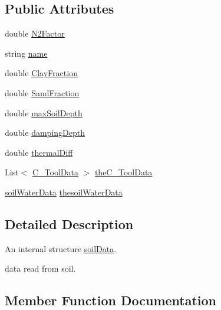 \subsection*{Public Attributes}
\begin{DoxyCompactItemize}
\item 
double \mbox{\hyperlink{struct_global_vars_1_1zone_specific_data_1_1soil_data_a787c2b731ff0fd4db270c8348e6cc8aa}{N2\+Factor}}
\item 
string \mbox{\hyperlink{struct_global_vars_1_1zone_specific_data_1_1soil_data_a9ecc5be71d90700844d9b81c63bdb783}{name}}
\item 
double \mbox{\hyperlink{struct_global_vars_1_1zone_specific_data_1_1soil_data_a407f8545f3d29ff6b7d3b93a8e4cc21c}{Clay\+Fraction}}
\item 
double \mbox{\hyperlink{struct_global_vars_1_1zone_specific_data_1_1soil_data_ad92bfc3e04d83b546704818cacf906fc}{Sand\+Fraction}}
\item 
double \mbox{\hyperlink{struct_global_vars_1_1zone_specific_data_1_1soil_data_a48561ed8b8243db62dc02b4a9ab431d8}{max\+Soil\+Depth}}
\item 
double \mbox{\hyperlink{struct_global_vars_1_1zone_specific_data_1_1soil_data_acd2818c5ed40b3a768e996b169fec90f}{damping\+Depth}}
\item 
double \mbox{\hyperlink{struct_global_vars_1_1zone_specific_data_1_1soil_data_a0488e637c08e5ff87bc85a1cd4bfac9c}{thermal\+Diff}}
\item 
List$<$ \mbox{\hyperlink{struct_global_vars_1_1zone_specific_data_1_1_c___tool_data}{C\+\_\+\+Tool\+Data}} $>$ \mbox{\hyperlink{struct_global_vars_1_1zone_specific_data_1_1soil_data_ad406b470fa37134c1f33cd469d769619}{the\+C\+\_\+\+Tool\+Data}}
\item 
\mbox{\hyperlink{struct_global_vars_1_1zone_specific_data_1_1soil_water_data}{soil\+Water\+Data}} \mbox{\hyperlink{struct_global_vars_1_1zone_specific_data_1_1soil_data_a52dda9378f991a31126bcb8c332b9588}{thesoil\+Water\+Data}}
\end{DoxyCompactItemize}


\subsection{Detailed Description}
An internal structure \mbox{\hyperlink{struct_global_vars_1_1zone_specific_data_1_1soil_data}{soil\+Data}}. 

data read from soil. 

\subsection{Member Function Documentation}
\mbox{\label{struct_global_vars_1_1zone_specific_data_1_1soil_data_ac1e39d153db5d24b006172b9a44ee05a}} 
